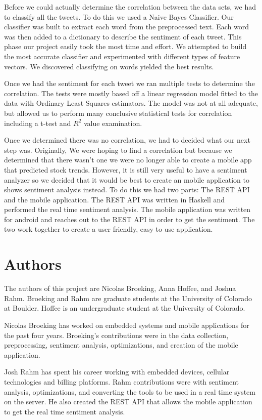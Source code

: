 \documentclass{acm_proc_article-sp}
\begin{document}
Before we could actually determine the correlation between the data sets, we had
to classify all the tweets.  To do this we used a Naive Bayes Classifier. Our
classifier was built to extract each word from the preprocessed text. Each word
was then added to a dictionary to describe the sentiment of each tweet.
This phase our project easily took the most time and effort. We attempted to
build the most accurate classifier and experimented with different types of
feature vectors. We discovered classifying on words yielded the best results.

Once we had the sentiment for each tweet we ran multiple tests to determine the
correlation.  The tests were mostly based off a linear regression model fitted
to the data with Ordinary Least Squares estimators. The model was not at all
adequate, but allowed us to perform many conclusive statistical tests for
correlation including a t-test and $R^2$ value examination. 

Once we determined there was no correlation, we had to decided what our
next step was. Originally, We were hoping to find a correlation but because we determined
that there wasn't one we were no longer able to create a mobile app
that predicted stock trends. However, it is still very useful to have a
sentiment analyzer so we decided that it would be best to create an mobile application to
shows sentiment analysis instead. To do this we had two parts: The REST API
and the mobile application. The REST API was written in Haskell and performed the real
time sentiment analysis.  The mobile application was written for android and reaches out
to the REST API in order to get the sentiment. The two work together to create a user
friendly, easy to use application.


\section{Authors}

The authors of this project are Nicolas Broeking, Anna
Hoffee, and Joshua Rahm. Broeking and Rahm are graduate students at the
University of Colorado at Boulder. Hoffee is an undergraduate student at the
University of Colorado.

Nicolas Broeking has worked on embedded systems and mobile applications for
the past four years. Broeking's contributions were in the data collection,
preprocessing, sentiment analysis, optimizations, and creation of the mobile
application. 

Josh Rahm has spent his career working with embedded devices, cellular
technologies and billing platforms. Rahm contributions were with sentiment
analysis, optimizations, and converting the tools to be used in a real time
system on the server. He also created  the REST API that allows the mobile application to get
the real time sentiment analysis.
\end{document}
